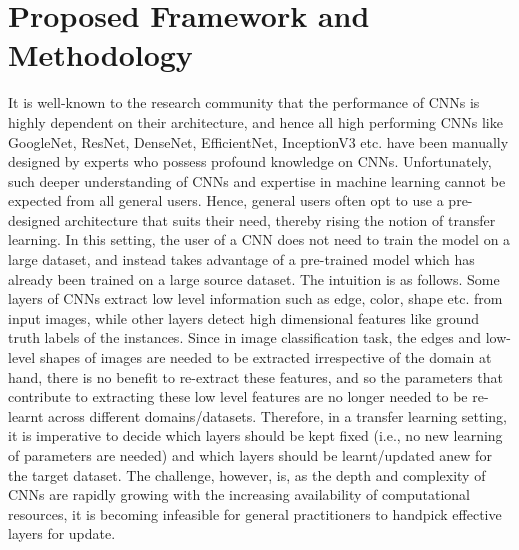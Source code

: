 \documentclass[a4paper,fleqn]{cas-sc}
\begin{document}
\section{Proposed Framework and Methodology}
\label{sec:proposed}

It is well-known to the research community that the performance of CNNs is highly dependent on their architecture, and hence all high performing CNNs like GoogleNet, ResNet, DenseNet, EfficientNet, InceptionV3 etc. have been manually designed by experts who possess profound  knowledge on CNNs. Unfortunately, such deeper understanding of CNNs and expertise in machine learning cannot be expected from all general users. Hence, general users often opt to use a pre-designed architecture that suits their need, thereby rising the notion of transfer learning. In this setting, the user of a CNN does not need to train the model on a large dataset, and instead  takes advantage of a pre-trained model which has already been trained on a large source dataset. The intuition is as follows. Some layers of CNNs extract low level information such as edge, color, shape etc. from input images, while other layers detect high dimensional features like ground truth labels of the instances. Since in image classification task, the edges and low-level shapes of images are needed to be extracted irrespective of the domain at hand, there is no benefit to re-extract these features, and so the parameters that contribute to extracting these low level features are no longer needed to be re-learnt across different domains/datasets. Therefore, in a transfer learning setting, it is imperative to decide which layers should be kept fixed (i.e., no new learning of parameters are needed) and which layers should be learnt/updated anew for the target dataset. The challenge, however, is, as the depth and complexity of CNNs are rapidly growing with the increasing availability of computational resources, it is becoming infeasible for general practitioners to handpick effective layers for update. %
\end{document}
